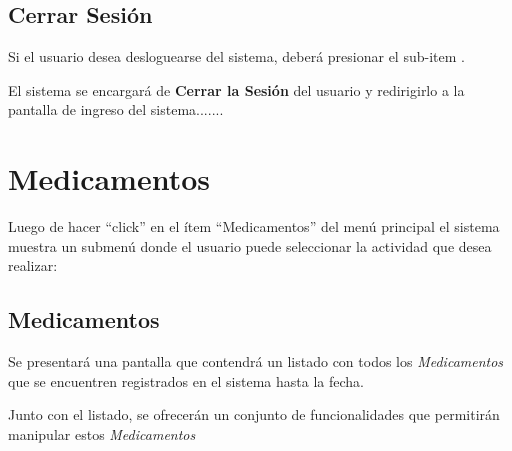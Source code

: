 \documentclass[a4paper,10pt,spanish]{sphinxmanual}
\begin{document}
\section{Cerrar Sesión}
\label{cerrarsesion:cerrar-sesion}\label{cerrarsesion::doc}
Si el usuario desea desloguearse del sistema, deberá presionar el sub-item .


El sistema se encargará de \textbf{Cerrar la Sesión} del usuario y redirigirlo a la pantalla de ingreso del sistema.......



\chapter{Medicamentos}
\label{medicamentos::doc}\label{medicamentos:medicamentos}
Luego de hacer ``click'' en el ítem “Medicamentos” del menú principal el sistema muestra un submenú donde el usuario puede seleccionar la actividad que desea realizar:


\section{Medicamentos}
\label{medicams::doc}\label{medicams:medicamentos}
Se presentará una pantalla que contendrá un listado con todos los \emph{Medicamentos} que se encuentren registrados en el sistema hasta la fecha.


Junto con el listado, se ofrecerán un conjunto de funcionalidades que permitirán manipular estos \emph{Medicamentos}
\end{document}
